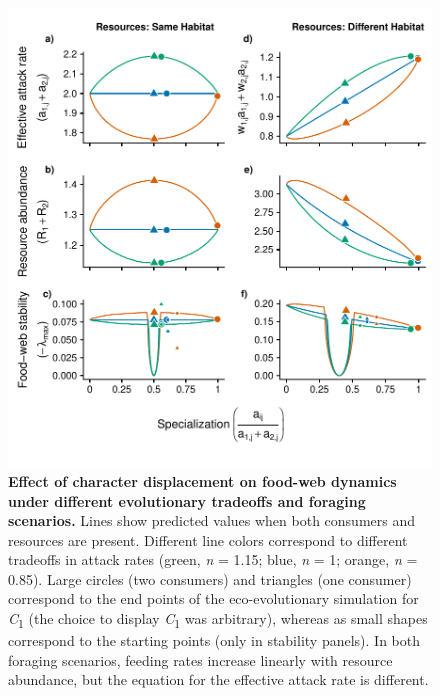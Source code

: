 \begin{figure}
\centering
\includegraphics{Fig_3_MacArthur_LawlorSmith.pdf}
\caption{\label{fig:plot_fig3}\textbf{Effect of character displacement
on food-web dynamics under different evolutionary tradeoffs and foraging
scenarios.} Lines show predicted values when both consumers and
resources are present. Different line colors correspond to different
tradeoffs in attack rates (green, \emph{n} = 1.15; blue, \emph{n} = 1;
orange, \emph{n} = 0.85). Large circles (two consumers) and triangles
(one consumer) correspond to the end points of the eco-evolutionary
simulation for \emph{C}\textsubscript{1} (the choice to display
\emph{C}\textsubscript{1} was arbitrary), whereas as small shapes
correspond to the starting points (only in stability panels). In both
foraging scenarios, feeding rates increase linearly with resource
abundance, but the equation for the effective attack rate is different.}
\end{figure}

